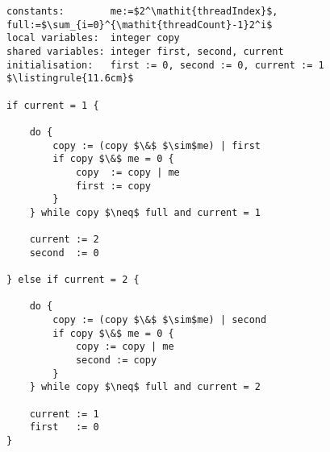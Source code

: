 \begin{center}
\begin{minipage}{\textwidth}
\begin{lstlisting}[mathescape, linewidth=11.6cm]
constants:        me:=$2^\mathit{threadIndex}$, full:=$\sum_{i=0}^{\mathit{threadCount}-1}2^i$
local variables:  integer copy
shared variables: integer first, second, current
initialisation:   first := 0, second := 0, current := 1
$\listingrule{11.6cm}$

if current = 1 {

	do {
		copy := (copy $\&$ $\sim$me) | first
		if copy $\&$ me = 0 {
			copy  := copy | me
			first := copy
		}
	} while copy $\neq$ full and current = 1

	current := 2
	second  := 0

} else if current = 2 {

	do {
		copy := (copy $\&$ $\sim$me) | second
		if copy $\&$ me = 0 {
			copy := copy | me
			second := copy
		}
	} while copy $\neq$ full and current = 2

	current := 1
	first   := 0
}
\end{lstlisting}
\end{minipage}
\end{center}
